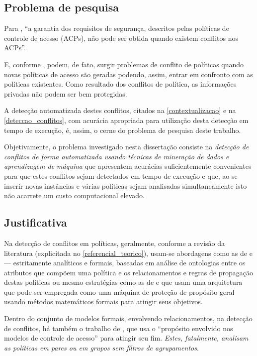 \documentclass[
	12pt,				%
	openright,			%
	oneside,			%
	a4paper,			%
	english,			%
	french,				%
	spanish,			%
	brazil				%
	]{abntex2}
\begin{document}
\subsection{Problema de pesquisa}\label{problema}

Para , ``a garantia dos requisitos de segurança, descritos pelas políticas de controle de acesso (ACPs), não pode ser obtida quando existem conflitos nos ACPs''. 

E, conforme , podem, de fato, surgir problemas de conflito de políticas quando novas políticas de acesso são geradas podendo, assim, entrar em confronto com as políticas existentes. Como resultado dos conflitos de política, as informações privadas não podem ser bem protegidas.

A detecção automatizada destes conflitos, citados na \autoref{contextualizacao} e na \autoref{deteccao_conflitos}, com acurácia apropriada para utilização desta detecção em tempo de execução, é, assim, o cerne do problema de pesquisa deste trabalho. 

Objetivamente, o problema investigado nesta dissertação consiste na \textit{detecção de conflitos de forma automatizada usando técnicas de mineração de dados e aprendizagem de máquina} que apresentem acurácias suficientemente convenientes para que estes conflitos sejam detectados em tempo de execução e que, ao se inserir novas instâncias e várias políticas sejam analisadas simultaneamente isto não acarrete um custo computacional elevado.

\subsection{Justificativa}\label{justificativa}
Na detecção de conflitos em políticas, geralmente, conforme a revisão da literatura (explicitada no \autoref{referencial_teorico}), usam-se abordagens como as de  e  --- estritamente analíticos e formais, baseadas em análise de ontologias entre os atributos que compõem uma política e os relacionamentos e regras de propagação destas políticas ou mesmo estratégias como as de  e  que usam uma arquitetura que pode ser empregada como uma máquina de proteção de propósito geral usando métodos matemáticos formais para atingir seus objetivos. 

Dentro do conjunto de modelos formais, envolvendo relacionamentos, na detecção de conflitos, há também o trabalho de , que usa o ``propósito envolvido nos modelos de controle de acesso'' para atingir seu fim. \textit{Estes, fatalmente, analisam as políticas em pares ou em grupos sem filtros de agrupamentos}.
\end{document}
